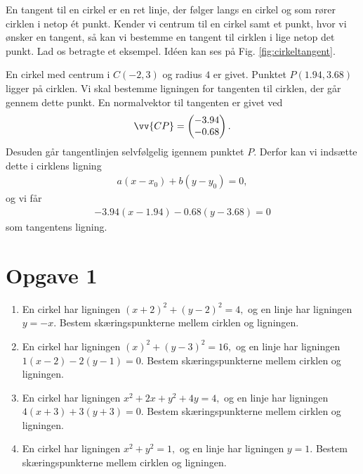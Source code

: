 En tangent til en cirkel er en ret linje, der følger langs en cirkel og som rører cirklen i netop ét punkt. Kender vi centrum til en cirkel samt et punkt, hvor vi ønsker en tangent, så kan vi bestemme en tangent til cirklen i lige netop det punkt. Lad os betragte et eksempel. Idéen kan ses på Fig. \ref{fig:cirkeltangent}.
\begin{figure}[H]
	\centering
	\resizebox{0.5\textwidth}{0.5\textwidth}
	{
	}
\end{figure}
\begin{exa}
	En cirkel med centrum i $C(-2,3)$ og radius $4$ er givet. Punktet $P(1.94, 3.68)$ ligger på cirklen. Vi skal bestemme ligningen for tangenten til cirklen, der går gennem
	dette punkt. En normalvektor til tangenten er givet ved
	\begin{align*}
		\vv{CP} = 
		\begin{pmatrix}
			-3.94 \\ -0.68
		\end{pmatrix}.
	\end{align*}
	Desuden går tangentlinjen selvfølgelig igennem punktet $P$. Derfor kan vi indsætte dette i cirklens ligning
	\begin{align*}
		a(x-x_0) + b(y-y_0)=0,
	\end{align*}
	og vi får
	\begin{align*}
		-3.94(x-1.94) -0.68(y-3.68) = 0
	\end{align*}
	som tangentens ligning. 
\end{exa}

\section*{Opgave 1}
\begin{enumerate}[label=\roman*)]
	\item En cirkel har ligningen $(x+2)^2+(y-2)^2 = 4,$ og en linje har ligningen $y=-x$. Bestem skæringspunkterne mellem cirklen og ligningen.
	\item En cirkel har ligningen $(x)^2+(y-3)^2 = 16,$ og en linje har ligningen $1(x-2)-2(y-1)=0$. Bestem skæringspunkterne mellem cirklen og ligningen.
	\item En cirkel har ligningen $x^2+2x+y^2+4y = 4,$ og en linje har ligningen $4(x+3)+3(y+3)=0$. Bestem skæringspunkterne mellem cirklen og ligningen.
	\item En cirkel har ligningen $x^2+y^2=1,$ og en linje har ligningen $y=1$. Bestem skæringspunkterne mellem cirklen og ligningen.
\end{enumerate}

